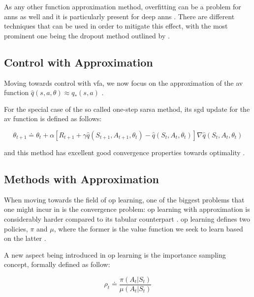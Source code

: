 \documentclass[draft=false]{seal_thesis}
\begin{document}
As any other function approximation method, overfitting can be a problem for \glspl{ann} as well and it is particularly present for deep \glspl{ann} \citep[p. 218]{Sutton2017}. There are different techniques that can be used in order to mitigate this effect, with the most prominent one being the dropout method outlined by \citet{Srivastava2014}.

\subsection{ Control with Approximation}
\label{subsec:onpol_control}

Moving towards control with \gls{vfa}, we now focus on the approximation of the \gls{av} function $\hat{q} (s,a,\theta) \approx q_* (s,a)$ \citep[p. 229]{Sutton2017}.

For the special case of the so called one-step \gls{sarsa} method, its \gls{sgd} update for the \gls{av} function is defined as follows:

\begin{equation}
	\theta_{t+1} \doteq \theta_t + \alpha [ R_{t+1} + \gamma \hat{q} (S_{t+1}, A_{t+1}, \theta_t) - \hat{q} (S_t, A_t, \theta_t) ] \nabla \hat{q} (S_t, A_t, \theta_t)
\end{equation}

and this method has excellent good convergence properties towards optimality \citep[p. 230]{Sutton2017}.

\subsection{ Methods with Approximation}
\label{subsec:offpol_methods}

When moving towards the field of \gls{op} learning, one of the biggest problems that one might incur in is the convergence problem: \gls{op} learning with approximation is considerably harder compared to its tabular counterpart \citep[p. 243]{Sutton2017}. \gls{op} learning defines two policies, $\pi$ and $\mu$, where the former is the value function we seek to learn based on the latter \citep[p. 243]{Sutton2017}.

A new aspect being introduced in \gls{op} learning is the importance sampling concept, formally defined as follow:

\begin{equation}
\label{eq:importance_sampling}
	\rho_t \doteq \frac{\pi(A_t|S_t)}{\mu(A_t|S_t)}
\end{equation}
\end{document}
